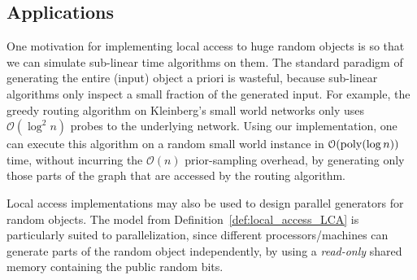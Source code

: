 \subsection{Applications}
\label{sec:applications}
One motivation for implementing local access to huge random objects is so that we can simulate sub-linear time algorithms on them.
The standard paradigm of generating the entire (input) object a priori is wasteful,
because sub-linear algorithms only inspect a small fraction of the generated input.
For example, the greedy routing algorithm on Kleinberg's small world networks \cite{kleinberg}
only uses $\mathcal O(\log^2 n)$ probes to the underlying network.
Using our implementation, one can execute this algorithm on a random small world instance in $\mathcal O(\mathrm{poly}(\log n))$ time,
without incurring the $\mathcal O(n)$ prior-sampling overhead, by generating only those parts of the graph that are accessed by the routing algorithm.

Local access implementations may also be used to design parallel generators for random objects.
The model from Definition~\ref{def:local_access_LCA} is particularly suited to parallelization,
since different processors/machines can generate parts of the random object independently,
by using a \emph{read-only} shared memory containing the public random bits.
